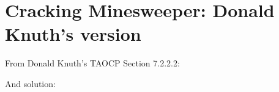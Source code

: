 \section{Cracking Minesweeper: Donald Knuth's version}

\renewcommand{\CURPATH}{equations/minesweeper_Knuth}

From Donald Knuth's \ac{TAOCP} Section 7.2.2.2:

\begin{figure}[H]
\centering
{}
\end{figure}

\begin{figure}[H]
\centering
{}
\end{figure}

And solution:

\begin{figure}[H]
\centering
{}
\end{figure}

\begin{figure}[H]
\centering
{}
\end{figure}
